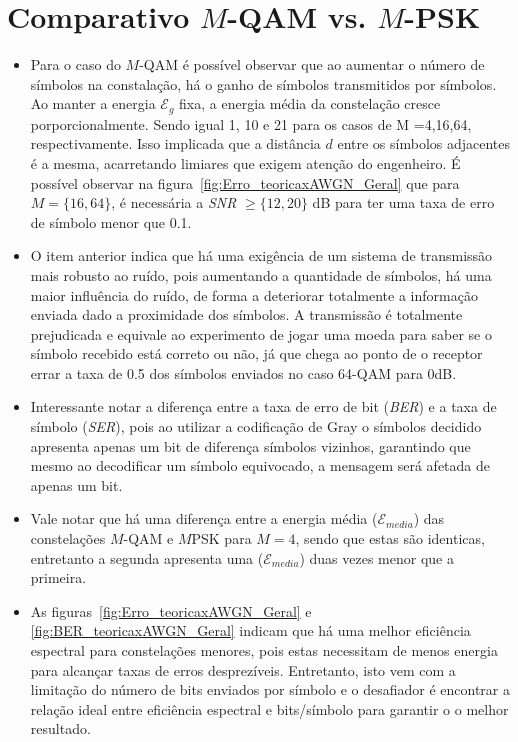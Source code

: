 \section{Comparativo \texorpdfstring{$M$}{M}-QAM vs. \texorpdfstring{$M$}{M}-PSK}


\begin{itemize}
    \item Para o caso do $M$-QAM é possível observar que ao aumentar o número de símbolos na constalação, há o ganho de símbolos transmitidos por símbolos. Ao manter a energia $\mathcal{E}_g$ fixa, a energia média da constelação cresce porporcionalmente. Sendo igual 1, 10 e 21 para os casos de M ={4,16,64}, respectivamente. Isso implicada que a distância $d$ entre os símbolos adjacentes é a mesma, acarretando limiares que exigem atenção do engenheiro. É possível observar na figura~\ref{fig:Erro_teoricaxAWGN_Geral} que para $M = \{16, 64\}$, é necessária a \textit{SNR} $\geq \{12, 20\}$ dB para ter uma taxa de erro de símbolo menor que 0.1.
    \item O item anterior indica que há uma exigência de um sistema de transmissão mais robusto ao ruído, pois aumentando a quantidade de símbolos, há uma maior influência do ruído, de forma a deteriorar totalmente a informação enviada dado a proximidade dos símbolos. A transmissão é totalmente prejudicada e equivale ao experimento de jogar uma moeda para saber se o símbolo recebido está correto ou não, já que chega ao ponto de o receptor errar a taxa de 0.5 dos símbolos enviados no caso 64-QAM para 0dB.
    \item Interessante notar a diferença entre a taxa de erro de bit (\textit{BER}) e a taxa de símbolo (\textit{SER}), pois ao utilizar a codificação de Gray o símbolos decidido apresenta apenas um bit de diferença símbolos vizinhos, garantindo que mesmo ao decodificar um símbolo equivocado, a mensagem será afetada de apenas um bit.
    \item Vale notar que há uma diferença entre a energia média ($\mathcal{E}_{media}$) das constelações $M$-QAM e $M$PSK para $M=4$, sendo que estas são identicas, entretanto a segunda apresenta uma ($\mathcal{E}_{media}$) duas vezes menor que a primeira.
    \item As figuras~\ref{fig:Erro_teoricaxAWGN_Geral} e \ref{fig:BER_teoricaxAWGN_Geral} indicam que há uma melhor eficiência espectral para constelações menores, pois estas necessitam de menos energia para alcançar taxas de erros desprezíveis. Entretanto, isto vem com a limitação do número de bits enviados por símbolo e o desafiador é encontrar a relação ideal entre eficiência espectral e bits/símbolo para garantir o o melhor resultado.
\end{itemize}

